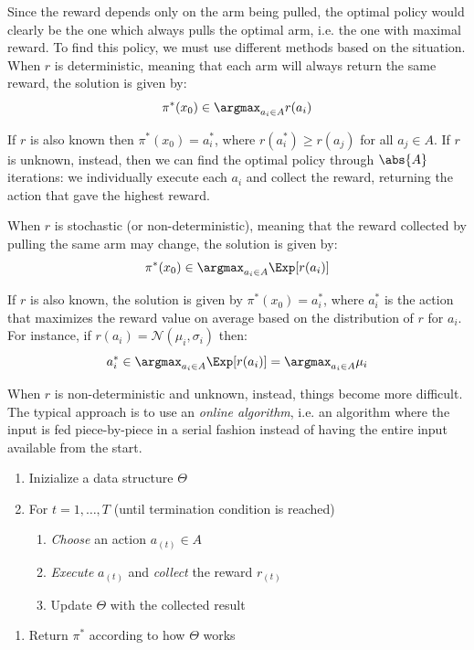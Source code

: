 \documentclass[a4paper, 12pt]{report}
\begin{document}
    Since the reward depends only on the arm being pulled, the optimal policy would clearly be the one which always pulls the optimal arm, i.e. the one with maximal reward. To find this policy, we must use different methods based on the situation. When $r$ is deterministic, meaning that each arm will always return the same reward, the solution is given by:
    \[\pi^*(x_0) \in \argmax_{a_i \in A} r(a_i)\]

    If $r$ is also known then $\pi^*(x_0) = a_i^*$, where $r(a_i^*) \geq r(a_j)$ for all $a_j \in A$. If $r$ is unknown, instead, then we can find the optimal policy through $\abs{A}$ iterations: we individually execute each $a_i$ and collect the reward, returning the action that gave the highest reward.

    When $r$ is stochastic (or non-deterministic), meaning that the reward collected by pulling the same arm may change, the solution is given by:
    \[\pi^*(x_0) \in \argmax_{a_i \in A} \Exp[r(a_i)]\]

    If $r$ is also known, the solution is given by $\pi^*(x_0) = a_i^*$, where $a_i^*$ is the action that maximizes the reward value on average based on the distribution of $r$ for $a_i$. For instance, if $r(a_i) = \mathcal{N}(\mu_i, \sigma_i)$ then:
    \[a_i^* \in \argmax_{a_i \in A} \Exp[r(a_i)] = \argmax_{a_i \in A} \mu_i\]

    When $r$ is non-deterministic and unknown, instead, things become more difficult. The typical approach is to use an \textit{online algorithm}, i.e. an algorithm where the input is fed piece-by-piece in a serial fashion instead of having the entire input available from the start.
    
    \begin{enumerate}
        \item Inizialize a data structure $\Theta$
        \item For $t = 1, \ldots, T$ (until termination condition is reached)
        \begin{enumerate}[label={\arabic*.}, start=3]
            \item \textit{Choose} an action $a_{(t)} \in A$
            \item \textit{Execute} $a_{(t)}$ and \textit{collect} the reward $r_{(t)}$
            \item Update $\Theta$ with the collected result 
        \end{enumerate}
    \end{enumerate}
    \begin{enumerate}[label={\arabic*.}, start=6]
        \item Return $\pi^*$ according to how $\Theta$ works
    \end{enumerate}
\end{document}
